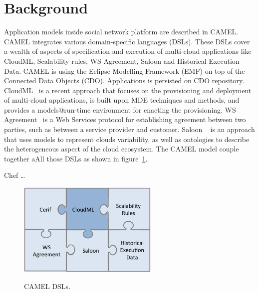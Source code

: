 
\section{Background}
Application models inside social network platform are described in CAMEL. CAMEL integrates various domain-specific languages (DSLs). These DSLs cover a wealth of aspects of specification and execution of multi-cloud applications like CloudML, Scalability rules, WS Agreement, Saloon and Historical Execution Data. CAMEL is using the Eclipse Modelling Framework (EMF) on top of the Connected Data Objects (CDO). Applications is persisted on CDO repository.
CloudML~\cite{FerryRossiniCMS13} is a recent approach that focuses on the provisioning and deployment of multi-cloud applications, is built upon MDE techniques and methods, and provides a models@run-time environment for enacting the provisioning.  WS Agreement~\cite{andrieux2007web} is a Web Services protocol for establishing agreement between two parties, such as between a service provider and customer. Saloon ~\cite{quinton2013towards} is an approach that uses models to represent clouds variability, as well as ontologies to describe the heterogeneous aspect of the cloud ecosystem. The CAMEL model couple together aAll those DSLs as shown in figure~\ref{fig:dsls}.

Chef \ldots


\begin{figure}[h]
	\caption{CAMEL DSLs.}
	\includegraphics[width=0.6\textwidth,natwidth=200,natheight=150]{./fig/dsl.png}
	\centering
	\label{fig:dsls}
\end{figure}



